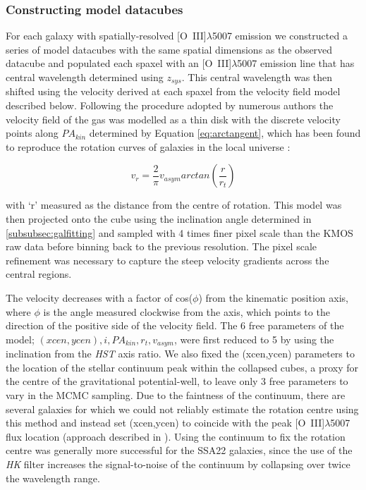 \documentclass[fleqn,usenatbib]{mnras}
\begin{document}
\subsubsection{Constructing model datacubes}\label{subsubec:model_cube}
For each galaxy with spatially-resolved [O~{\sc III}]$\lambda$5007 emission we constructed a series of model datacubes with the same spatial dimensions as the observed datacube and populated each spaxel with an [O~{\sc III}]$\lambda$5007 emission line that has central wavelength determined using $z_{sys}$.
This central wavelength was then shifted using the velocity derived at each spaxel from the velocity field model described below.  
Following the procedure adopted by numerous authors \citep[e.g.][]{Epinat2010,Epinat2012,Swinbank2012,Stott2016,Mason2017} the velocity field of the gas was modelled as a thin disk with the discrete velocity points along $PA_{kin}$ determined by Equation \ref{eq:arctangent}, which has been found to reproduce the rotation curves of galaxies in the local universe \citep[e.g.][]{Courteau1997}:

\begin{equation}\label{eq:arctangent}
   v_{r} = \frac{2}{\pi}v_{asym}arctan\left(\frac{r}{r_{t}}\right)
\end{equation}


with `r' measured as the distance from the centre of rotation.
This model was then projected onto the cube using the inclination angle determined in \cref{subsubsec:galfitting} and sampled with 4 times finer pixel scale than the KMOS raw data before binning back to the previous resolution.
The pixel scale refinement was necessary to capture the steep velocity gradients across the central regions.


The velocity decreases with a factor of cos($\phi$) from the kinematic position axis, where $\phi$ is the angle measured clockwise from the axis, which points to the direction of the positive side of the velocity field.
The 6 free parameters of the model; $(xcen, ycen), i, PA_{kin}, r_{t}, v_{asym}$, were first reduced to 5 by using the inclination from the {\em HST} axis ratio.
We also fixed the (xcen,ycen) parameters to the location of the stellar continuum peak within the collapsed cubes, a proxy for the centre of the gravitational potential-well, to leave only 3 free parameters to vary in the MCMC sampling.
Due to the faintness of the continuum, there are several galaxies for which we could not reliably estimate the rotation centre using this method and instead set (xcen,ycen) to coincide with the peak [O~{\sc III}]$\lambda$5007 flux location (approach described in \citealt{Harrison2017}).
Using the continuum to fix the rotation centre was generally more successful for the SSA22 galaxies, since the use of the {\it HK} filter increases the signal-to-noise of the continuum by collapsing over twice the wavelength range. \\
\end{document}
